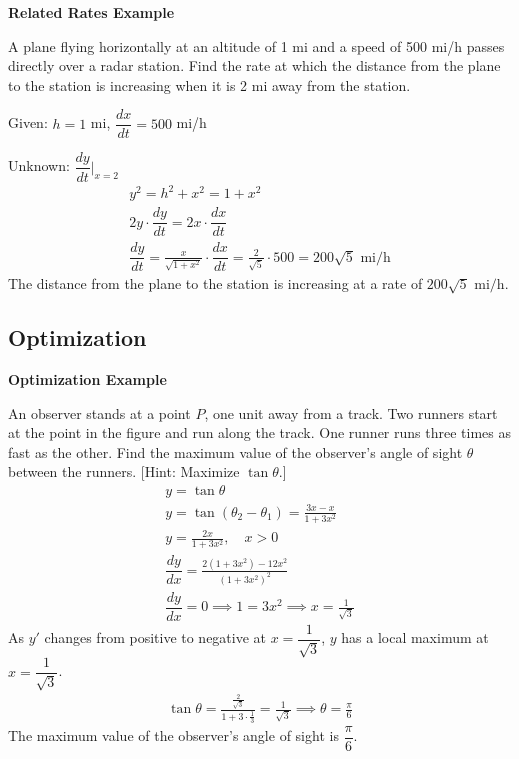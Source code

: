 \documentclass{article}
\newcommand{\vem}{\vspace{0.5em}}
\newcommand{\dydx}{\dfrac{dy}{dx}}
\newcommand{\dydt}{\dfrac{dy}{dt}}
\newcommand{\dxdt}{\dfrac{dx}{dt}}
\begin{document}
\textbf{Related Rates Example}

A plane flying horizontally at an altitude of 1 mi and a speed of 500 mi/h passes directly over a radar station. Find the rate at which the distance from the plane to the station is increasing when it is 2 mi away from the station. \vem

Given: $h=1$ mi, $\dxdt=500$ mi/h\vem

Unknown: $\dydt \Big|_{x= 2}$
\begin{gather*}
    y^2=h^2+x^2=1+x^2\\
    2y\cdot \dydt=2x\cdot \dxdt\\
    \dydt=\frac{x}{\sqrt{1+x^2}}\cdot  \dxdt=\frac{2}{\sqrt{5}}\cdot 500=\boxed{200\sqrt{5} \text{ mi/h}}
\end{gather*}
The distance from the plane to the station is increasing at a rate of $200\sqrt{5} \text{ mi/h}$.

\subsection{Optimization}

\textbf{Optimization Example}

 An observer stands at a point $P$, one unit away from a track. Two runners start at the point in the
figure and run along the track. One runner runs three times as fast as the other. Find the maximum
value of the observer’s angle of sight $\theta$ between the runners. [Hint: Maximize $\tan \theta$.]
\begin{gather*}
    y=\tan \theta\\
    y=\tan (\theta_2-\theta _1)=\frac{3x-x}{1+3x^2}\\
    y=\frac{2x}{1+3x^2},\quad x>0\\
    \dydx=\frac{2(1+3x^2)-12x^2}{(1+3x^2)^2}\\
    \dydx =0 \implies 1=3x^2 \implies \boxed{x=\frac{1}{\sqrt{3}}}
\end{gather*}
As $y'$ changes from positive to negative at $x=\dfrac{1}{\sqrt{3}}$, $y$ has a local maximum at $x=\dfrac{1}{\sqrt{3}}$.
\begin{gather*}
    \tan \theta = \frac{\frac{2}{\sqrt{3}}}{1+3\cdot \frac{1}{3}}=\frac{1}{\sqrt{3}}\implies \boxed{\theta = \frac{\pi}{6}}
\end{gather*}
The maximum value of the observer's angle of sight is $\dfrac{\pi}{6}$.
\end{document}

